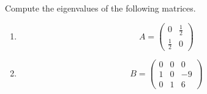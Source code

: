 Compute the eigenvalues of the following matrices.
\begin{enumerate}
	\item $$ A= 
		\begin{pmatrix}
		0&\frac{1}{2}\\
		\frac{1}{2}&0
		\end{pmatrix}
		$$
	\item
	$$ B=
	\begin{pmatrix}
	0&0&0\\
	1&0&-9\\
	0&1&6
	\end{pmatrix}
	$$
\end{enumerate}
 